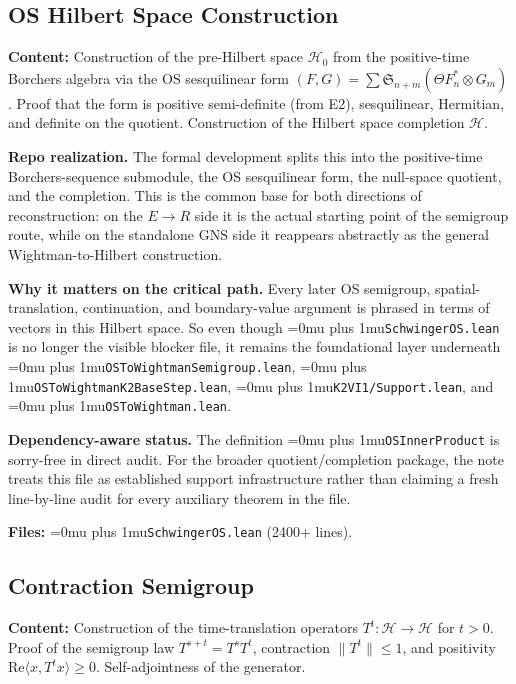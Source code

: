 \documentclass[11pt,a4paper]{article}
\newcommand{\leanfile}[1]{\begingroup\Urlmuskip=0mu plus 1mu\relax\nolinkurl{#1}\endgroup}
\newcommand{\leanname}[1]{\begingroup\Urlmuskip=0mu plus 1mu\relax\nolinkurl{#1}\endgroup}
\begin{document}
\subsection{OS Hilbert Space Construction}

\textbf{Content:} Construction of the pre-Hilbert space $\mathscr{H}_0$
from the positive-time Borchers algebra via the OS sesquilinear form
$(F, G) = \sum \mathfrak{S}_{n+m}(\Theta F_n^* \otimes G_m)$.
Proof that the form is positive semi-definite (from E2), sesquilinear,
Hermitian, and definite on the quotient. Construction of the Hilbert
space completion $\mathscr{H}$.

\medskip\noindent
\textbf{Repo realization.}
The formal development splits this into the positive-time Borchers-sequence
submodule, the OS sesquilinear form, the null-space quotient, and the completion.
This is the common base for both directions of reconstruction: on the $E \to R$
side it is the actual starting point of the semigroup route, while on the
standalone GNS side it reappears abstractly as the general Wightman-to-Hilbert
construction.

\medskip\noindent
\textbf{Why it matters on the critical path.}
Every later OS semigroup, spatial-translation, continuation, and boundary-value
argument is phrased in
terms of vectors in this Hilbert space. So even though
\leanfile{SchwingerOS.lean} is no longer the visible blocker file, it remains the
foundational layer underneath \leanfile{OSToWightmanSemigroup.lean},
\leanfile{OSToWightmanK2BaseStep.lean}, \leanfile{K2VI1/Support.lean}, and
\leanfile{OSToWightman.lean}.

\medskip\noindent
\textbf{Dependency-aware status.}
The definition \leanname{OSInnerProduct} is sorry-free in direct audit. For the
broader quotient/completion package, the note treats this file as established
support infrastructure rather than claiming a fresh line-by-line audit for every
auxiliary theorem in the file.

\textbf{Files:} \leanname{SchwingerOS.lean} (2400+ lines).

\subsection{Contraction Semigroup}

\textbf{Content:} Construction of the time-translation operators
$T^t : \mathscr{H} \to \mathscr{H}$ for $t > 0$. Proof of the
semigroup law $T^{s+t} = T^s T^t$, contraction $\|T^t\| \leq 1$,
and positivity $\mathrm{Re}\langle x, T^t x\rangle \geq 0$.
Self-adjointness of the generator.
\end{document}
